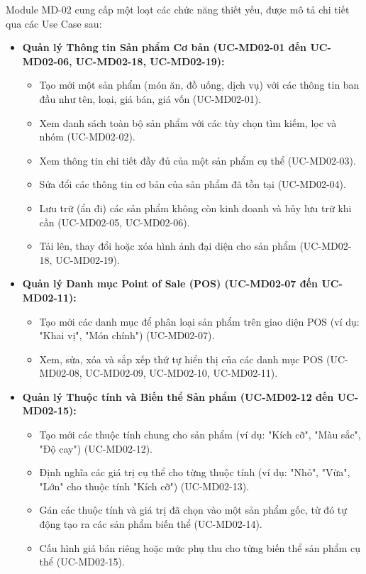 \label{sssec:md02_key_functionalities}
Module MD-02 cung cấp một loạt các chức năng thiết yếu, được mô tả chi tiết qua các Use Case sau:

\begin{itemize}
    \item \textbf{Quản lý Thông tin Sản phẩm Cơ bản (UC-MD02-01 đến UC-MD02-06, UC-MD02-18, UC-MD02-19):}
    \begin{itemize}
        \item Tạo mới một sản phẩm (món ăn, đồ uống, dịch vụ) với các thông tin ban đầu như tên, loại, giá bán, giá vốn (UC-MD02-01).
        \item Xem danh sách toàn bộ sản phẩm với các tùy chọn tìm kiếm, lọc và nhóm (UC-MD02-02).
        \item Xem thông tin chi tiết đầy đủ của một sản phẩm cụ thể (UC-MD02-03).
        \item Sửa đổi các thông tin cơ bản của sản phẩm đã tồn tại (UC-MD02-04).
        \item Lưu trữ (ẩn đi) các sản phẩm không còn kinh doanh và hủy lưu trữ khi cần (UC-MD02-05, UC-MD02-06).
        \item Tải lên, thay đổi hoặc xóa hình ảnh đại diện cho sản phẩm (UC-MD02-18, UC-MD02-19).
    \end{itemize}

    \item \textbf{Quản lý Danh mục Point of Sale (POS) (UC-MD02-07 đến UC-MD02-11):}
    \begin{itemize}
        \item Tạo mới các danh mục để phân loại sản phẩm trên giao diện POS (ví dụ: "Khai vị", "Món chính") (UC-MD02-07).
        \item Xem, sửa, xóa và sắp xếp thứ tự hiển thị của các danh mục POS (UC-MD02-08, UC-MD02-09, UC-MD02-10, UC-MD02-11).
    \end{itemize}

    \item \textbf{Quản lý Thuộc tính và Biến thể Sản phẩm (UC-MD02-12 đến UC-MD02-15):}
    \begin{itemize}
        \item Tạo mới các thuộc tính chung cho sản phẩm (ví dụ: "Kích cỡ", "Màu sắc", "Độ cay") (UC-MD02-12).
        \item Định nghĩa các giá trị cụ thể cho từng thuộc tính (ví dụ: "Nhỏ", "Vừa", "Lớn" cho thuộc tính "Kích cỡ") (UC-MD02-13).
        \item Gán các thuộc tính và giá trị đã chọn vào một sản phẩm gốc, từ đó tự động tạo ra các sản phẩm biến thể (UC-MD02-14).
        \item Cấu hình giá bán riêng hoặc mức phụ thu cho từng biến thể sản phẩm cụ thể (UC-MD02-15).
    \end{itemize}


\end{itemize}
